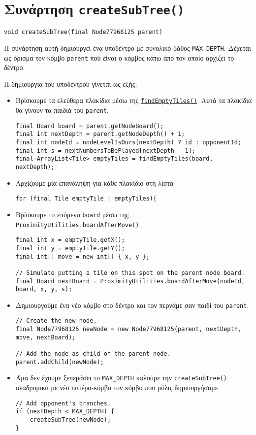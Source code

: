 \section{Συνάρτηση \texttt{createSubTree()}}
\begin{lstlisting}[style=declaration]
void createSubTree(final Node77968125 parent)
\end{lstlisting}
Η συνάρτηση αυτή δημιουργεί ένα υποδέντρο με συνολικό βάθος \lstinline!MAX_DEPTH!.
Δέχεται ως όρισμα τον κόμβο \lstinline!parent! πού είναι ο κόμβος κάτω από τον οποίο αρχίζει το δέντρο.

Η δημιουργία του υποδέντρου γίνεται ως εξής:
\begin{itemize}
\item Βρίσκουμε τα ελεύθερα πλακίδια μέσω της \hyperref[fun:findEmptyTiles]{\lstinline!findEmptyTiles()!}.
Αυτά τα πλακίδια θα γίνουν τα παιδιά του \lstinline!parent!.
\begin{lstlisting}[style=chunk]
final Board board = parent.getNodeBoard();
final int nextDepth = parent.getNodeDepth() + 1;
final int nodeId = nodeLevelIsOurs(nextDepth) ? id : opponentId;
final int s = nextNumbersToBePlayed[nextDepth - 1];
final ArrayList<Tile> emptyTiles = findEmptyTiles(board, nextDepth);
\end{lstlisting}

\item Αρχίζουμε μία επανάληψη για κάθε πλακίδιο στη λίστα
\begin{lstlisting}[style=chunk]
for (final Tile emptyTile : emptyTiles){
\end{lstlisting}

\item Βρίσκουμε το επόμενο \lstinline!board! μέσω της \lstinline!ProximityUtilities.boardAfterMove()!.
\begin{lstlisting}[style=chunk]
final int x = emptyTile.getX();
final int y = emptyTile.getY();
final int[] move = new int[] { x, y };

// Simulate putting a tile on this spot on the parent node board.
final Board nextBoard = ProximityUtilities.boardAfterMove(nodeId, board, x, y, s);
\end{lstlisting}

\item Δημιουργούμε ένα νέο κόμβο στο δέντρο και τον περνάμε σαν παιδί του \lstinline!parent!.
\begin{lstlisting}[style=chunk]
// Create the new node.
final Node77968125 newNode = new Node77968125(parent, nextDepth, move, nextBoard);

// Add the node as child of the parent node.
parent.addChild(newNode);
\end{lstlisting}

\item Άμα δεν έχουμε ξεπεράσει το \lstinline!MAX_DEPTH! καλούμε την \lstinline!createSubTree()! αναδρομικά με νέο πατέρα-κόμβο τον κόμβο που μόλις δημιουργήσαμε.
\begin{lstlisting}[style=chunk]
// Add opponent's branches.
if (nextDepth < MAX_DEPTH) {
    createSubTree(newNode);
}
\end{lstlisting}
\end{itemize}
